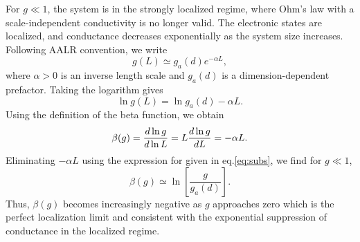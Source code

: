 For $g\ll 1$, the system is in the strongly localized regime, where Ohm's law with a scale-independent conductivity is no longer valid\cite{Anderson1958,LeeRamakrishnan1985}. The electronic states are localized, and conductance decreases exponentially as the system size increases. Following AALR convention, we write
\begin{equation}
    g(L)\simeq g_a(d)e^{-\alpha L},
\end{equation}
where $\alpha>0$ is an inverse length scale and $g_a(d)$ is a dimension-dependent prefactor. Taking the logarithm gives
\begin{equation}
    \ln g(L)=\ln g_a(d)-\alpha L.
    \label{eq:subs}
\end{equation}
Using the definition of the beta function, we obtain
\[
    \beta(g)
    =\frac{d\ln g}{d\ln L}
    =L\frac{d\ln g}{dL}\\
    =-\alpha L.
\]
Eliminating $-\alpha L$ using the expression for given in eq.\ref{eq:subs}, we find for $g\ll1$,
\begin{equation}
    \beta(g)\simeq
    \ln\!\left[\frac{g}{g_a(d)}\right].
    \label{eq:exp_regime}
\end{equation}
Thus, $\beta(g)$ becomes increasingly negative as $g$ approaches zero which is the perfect localization limit and consistent with the exponential suppression of conductance in the localized regime.
